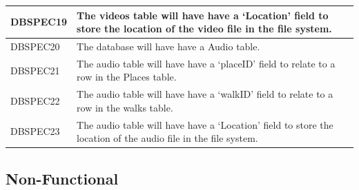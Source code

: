 \documentclass[11pt,a4paper]{article}
\begin{document}
\begin{longtable}{|p{2.5cm}p{13cm}|}
DBSPEC19 & The videos table will have have a `Location' field to store the location of the video file in the file system.\\ \hline
DBSPEC20 & The database will have have a Audio table. \\ \hline
DBSPEC21 & The audio table will have have a `placeID' field to relate to a row in the Places table. \\ \hline
DBSPEC22 & The audio table will have have a `walkID' field to relate to a row in the walks table.\\ \hline
DBSPEC23 & The audio table will have have a `Location' field to store the location of the audio file in the file system.\\ \hline

\end{longtable}

\subsection{Non-Functional}
\label{sec:non-func-specs}
\end{document}
